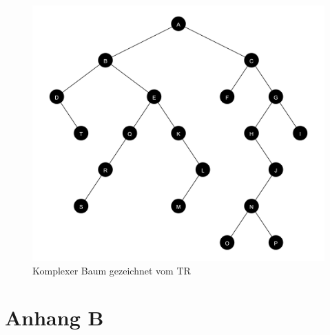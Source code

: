 \begin{figure}[ht]
    \centering
    \includegraphics[scale = 0.11]{abbildungen/komplex_a3}
    \caption{Komplexer Baum gezeichnet vom \ac{TR}}
    \label{pic:komplex_a3}
\end{figure}

\chapter{Anhang B}
\label{chap:anhang_b}








